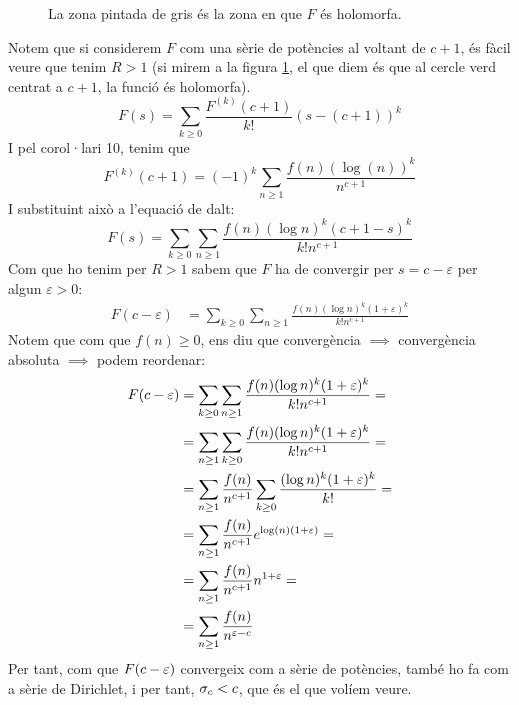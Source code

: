 \begin{pf}
    \begin{figure}
        \begin{center}
            \caption{\label{fig:thm13}La zona pintada de gris és la zona en que $F$ és holomorfa.}
        \end{center}
    
    \end{figure}
    Notem que si considerem $F$ com una sèrie de potències al voltant de $c+1$, és fàcil veure que tenim $R>1$ (si mirem a la figura \ref{fig:thm13}, el que diem és que al cercle verd centrat a $c+1$, la funció és holomorfa).
    \[
    F(s)=\sum_{k\geq0}\frac{F^{(k)}(c+1)}{k!}(s-(c+1))^k
    \]
    I pel corol·lari 10, tenim que
    \[
    F^{(k)}(c+1)=(-1)^k\sum_{n\geq1}\frac{f(n)(\log(n))^k}{n^{c+1}}
    \]
    I substituint això a l'equació de dalt:
    \[
    F(s)=\sum_{k\geq0}\sum_{n\geq1}\frac{f(n)(\log n)^k(c+1-s)^k}{k!n^{c+1}}
    \]
    Com que ho tenim per $R>1$ sabem que $F$ ha de convergir per $s=c-\varepsilon$ per algun $\varepsilon>0$:
    \begin{align*}
        F(c-\varepsilon)&=\sum_{k\geq0}\sum_{n\geq1}\frac{f(n)(\log n)^k(1+\varepsilon)^k}{k!n^{c+1}}
    \end{align*}
    Notem que com que $f(n)\geq0$, ens diu que convergència $\implies$ convergència absoluta $\implies$ podem reordenar:
    \begin{align*}
        F(c-\varepsilon)&=\sum_{k\geq0}\sum_{n\geq1}\frac{f(n)(\log n)^k(1+\varepsilon)^k}{k!n^{c+1}}=\\
        &=\sum_{n\geq1}\sum_{k\geq0}\frac{f(n)(\log n)^k(1+\varepsilon)^k}{k!n^{c+1}}=\\
        &=\sum_{n\geq1}\frac{f(n)}{n^{c+1}}\sum_{k\geq0}\frac{(\log n)^k(1+\varepsilon)^k}{k!}=\\
        &=\sum_{n\geq1}\frac{f(n)}{n^{c+1}}e^{\log(n)(1+\varepsilon)}=\\
        &=\sum_{n\geq1}\frac{f(n)}{n^{c+1}}n^{1+\varepsilon}=\\
        &=\sum_{n\geq1}\frac{f(n)}{n^{\varepsilon-c}}
    \end{align*}
    Per tant, com que $F(c-\varepsilon)$ convergeix com a sèrie de potències, també ho fa com a sèrie de Dirichlet, i per tant, $\sigma_c<c$, que és el que volíem veure.
\end{pf}
